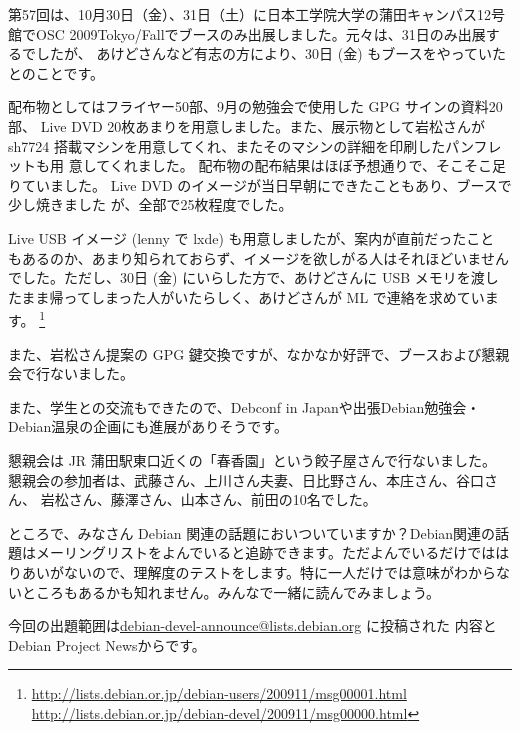 \documentclass[mingoth,a4paper]{jsarticle}
\begin{document}
第57回は、10月30日（金）、31日（土）に日本工学院大学の蒲田キャンパス12号館でOSC
2009Tokyo/Fallでブースのみ出展しました。元々は、31日のみ出展するでしたが、
あけどさんなど有志の方により、30日 (金) もブースをやっていたとのことです。

配布物としてはフライヤー50部、9月の勉強会で使用した GPG サインの資料20部、
Live DVD 20枚あまりを用意しました。また、展示物として岩松さんが sh7724
搭載マシンを用意してくれ、またそのマシンの詳細を印刷したパンフレットも用
意してくれました。
配布物の配布結果はほぼ予想通りで、そこそこ足りていました。
Live DVD のイメージが当日早朝にできたこともあり、ブースで少し焼きました
が、全部で25枚程度でした。

Live USB イメージ (lenny で lxde) も用意しましたが、案内が直前だったこと
もあるのか、あまり知られておらず、イメージを欲しがる人はそれほどいません
でした。ただし、30日 (金) にいらした方で、あけどさんに USB メモリを渡し
たまま帰ってしまった人がいたらしく、あけどさんが ML で連絡を求めています。
\footnote{\url{http://lists.debian.or.jp/debian-users/200911/msg00001.html} \\
\url{http://lists.debian.or.jp/debian-devel/200911/msg00000.html}}

また、岩松さん提案の GPG 鍵交換ですが、なかなか好評で、ブースおよび懇親
会で行ないました。

また、学生との交流もできたので、Debconf in Japanや出張Debian勉強会・
Debian温泉の企画にも進展がありそうです。

懇親会は JR 蒲田駅東口近くの「春香園」という餃子屋さんで行ないました。
懇親会の参加者は、武藤さん、上川さん夫妻、日比野さん、本庄さん、谷口さん、
岩松さん、藤澤さん、山本さん、前田の10名でした。


ところで、みなさん Debian 関連の話題においついていますか？Debian関連の話
題はメーリングリストをよんでいると追跡できます。ただよんでいるだけではは
りあいがないので、理解度のテストをします。特に一人だけでは意味がわからな
いところもあるかも知れません。みんなで一緒に読んでみましょう。

今回の出題範囲は\url{debian-devel-announce@lists.debian.org} に投稿された
内容とDebian Project Newsからです。

\begin{multicols}{2}
 
\end{multicols}

\clearpage
\end{document}
